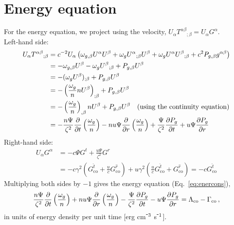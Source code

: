 \documentclass[../main.tex]{subfiles}
\begin{document}
\section*{Energy equation}
For the energy equation, we project using the velocity, $U_\alpha T^{\alpha\beta}{}_{;\beta}=U_\alpha G^\alpha$.\\
Left-hand side:
\begin{align*}
    U_\alpha T^{\alpha\beta}{}_{;\beta}&=
    c^{-2}U_\alpha\left(\omega_{g,\beta}U^\alpha U^\beta+\omega_gU^\alpha{}_{;\beta}U^\beta+\omega_gU^\alpha U^\beta{}_{;\beta}+c^2P_{g,\beta}g^{\alpha\beta}\right)\\
    &=-\omega_{g,\beta}U^\beta-\omega_gU^\beta{}_{;\beta}+P_{g,\beta}U^\beta\\
    &=-(\omega_g U^\beta)_{;\beta}+P_{g,\beta}U^\beta\\
    &=-\left(\frac{\omega_g}{n} n U^\beta\right)_{;\beta}+P_{g,\beta}U^\beta\\
    &=-\left(\frac{\omega_g}{n} \right)_{,\beta}n U^\beta+P_{g,\beta}U^\beta \quad \text{(using the continuity equation)}\\
    &=-\frac{n \Psi}{\zeta^2}\frac{\partial}{\partial t}\left(\frac{\omega_g}{n}\right)-n u\Psi\frac{\partial}{\partial r}\left(\frac{\omega_g}{n}\right)+\frac{\Psi}{\zeta^2}\frac{\partial P_g}{\partial t}+u\Psi\frac{\partial P_g}{\partial r}
\end{align*}
Right-hand side:
\begin{align*}
    U_\alpha G^\alpha&=-c\Psi G^t+\frac{u\Psi}{\zeta^2}G^r\\
    &=-c\gamma^2\left(G^{\hat{t}}_\text{co}+\frac{u}{c}G^{\hat{r}}_\text{co}\right)+u\gamma^2\left(\frac{u}{c}G^{\hat{t}}_\text{co}+G^{\hat{r}}_\text{co}\right)=-cG^{\hat{t}}_\text{co}
\end{align*}
Multiplying both sides by $-1$ gives the energy equation (Eq.~\ref{eq:enercons}),
\begin{equation}
    \frac{n \Psi}{\zeta^2}\frac{\partial}{\partial t}\left(\frac{\omega_g}{n}\right)+n u\Psi\frac{\partial}{\partial r}\left(\frac{\omega_g}{n}\right)-\frac{\Psi}{\zeta^2}\frac{\partial P_g}{\partial t}-u\Psi\frac{\partial P_g}{\partial r}=\Lambda_\text{co}-\Gamma_\text{co}\,,
\end{equation}
in units of energy density per unit time [erg cm$^{\-3}$ s$^{\-1}$].
\end{document}
